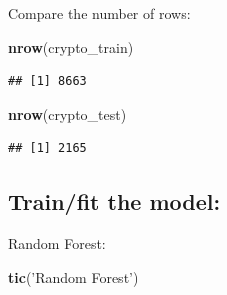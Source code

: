 \documentclass[
]{book}
\newenvironment{Shaded}{\begin{snugshade}}{\end{snugshade}}
\newcommand{\CommentTok}[1]{\textcolor[rgb]{0.56,0.35,0.01}{\textit{#1}}}
\newcommand{\DataTypeTok}[1]{\textcolor[rgb]{0.13,0.29,0.53}{#1}}
\newcommand{\KeywordTok}[1]{\textcolor[rgb]{0.13,0.29,0.53}{\textbf{#1}}}
\newcommand{\NormalTok}[1]{#1}
\newcommand{\OperatorTok}[1]{\textcolor[rgb]{0.81,0.36,0.00}{\textbf{#1}}}
\newcommand{\StringTok}[1]{\textcolor[rgb]{0.31,0.60,0.02}{#1}}
\begin{document}
Compare the number of rows:

\begin{Shaded}
\begin{Highlighting}[]
\KeywordTok{nrow}\NormalTok{(crypto_train)}
\end{Highlighting}
\end{Shaded}

\begin{verbatim}
## [1] 8663
\end{verbatim}

\begin{Shaded}
\begin{Highlighting}[]
\KeywordTok{nrow}\NormalTok{(crypto_test)}
\end{Highlighting}
\end{Shaded}

\begin{verbatim}
## [1] 2165
\end{verbatim}

\hypertarget{trainfit-the-model}{%
\subsection{Train/fit the model:}\label{trainfit-the-model}}

\begin{Shaded}
\end{Shaded}

Random Forest:

\begin{Shaded}
\begin{Highlighting}[]
\KeywordTok{tic}\NormalTok{(}\StringTok{'Random Forest'}\NormalTok{)}
\end{Highlighting}
\end{Shaded}

\begin{Shaded}
\end{Shaded}
\end{document}
